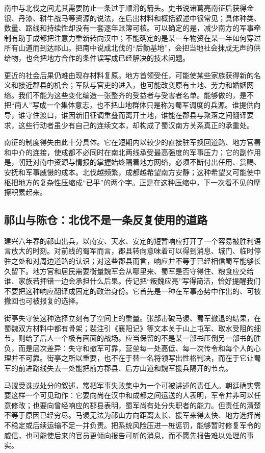 南中与北伐之间尤其需要防止一条过于顺滑的箭头。史书说诸葛亮南征后获得金银、丹漆、耕牛战马等资源的说法，在后出材料和概括叙述中很常见；具体种类、数量、路线和持续性却没有一套逐年账簿可核。可以确定的是，减少南方的军事牵制有助于成都把注意力重新转向汉中；不能确定的是某一车物资在某一年如何穿过所有山道而到达祁山。把南中说成北伐的“后勤基地”，会把当地社会抹成无声的供给物，也会把地方合作的条件误写成已经解决的技术问题。

更近的社会后果仍难由现存材料复原。地方首领受任，可能使某些家族获得新的名义和接近郡县的机会；军队与官吏的进入，也可能改变原有土地、劳力和婚姻网络。我们不能为这些变化编造一张整齐的受益者与受害者名单。能够做的，是不把“南人”写成一个集体意志，也不把山地群体只是称为蜀军调度的兵源。谁提供向导，谁守住渡口，谁因新旧征调重叠而离开土地，谁能在郡县与聚落之间翻译要求，这些行动者虽少有自己的连续文本，却构成了蜀汉南方关系真正的承重处。

南征的制度得失由此十分具体。它在短期内以较少的直接驻军换回道路、地方官署和中介的连接，使成都不必同时在南北两线承受最高强度的军事压力；它的副作用是，朝廷对南中资源与情报的掌握始终隔着地方网络，必须不断付出任用、赏赐、安抚和军事威慑的成本。北伐越频繁，成都越希望南方安静；这种希望又可能使中枢把地方的复杂性压缩成“已平”的两个字。正是在这种压缩中，下一次看不见的摩擦积累起来。

\subsection{祁山与陈仓：北伐不是一条反复使用的道路}

建兴六年春的祁山出兵，以南安、天水、安定的短暂响应打开了一个容易被胜利语言放大的时刻。对前线的蜀军而言，郡县转向意味着可以得到消息、城门、临时停驻之处和对周边道路的认识；对这些郡县而言，响应并不等于已经相信蜀军能够长久留下。地方官和居民需要衡量魏军会从哪里来、蜀军是否守得住、粮食应交给谁、家族若押错一边会承担什么后果。传记把“叛魏应亮”写得简洁，恰好提醒我们不要把这种响应翻译成固定的政治身份。它首先是一种在军事态势中作出的、可被撤回也可被报复的选择。

街亭失守使这种选择立刻有了空间上的重量。张郃击破马谡、蜀军撤退的结果，在蜀魏双方材料中都有骨架；裴注引《襄阳记》等文本关于山上屯军、取水受阻的细节，则给了后人一个极有画面的战场。应当保留的不是某一部书压倒另一部书的胜负，而是层次差异：失守和撤军可靠，营垒每一处高低、每一次传令和每个人的心理并不可靠。街亭之所以重要，也不在于替一名将领写出性格判决，而在于它让蜀军的前进路线失去一处能把前方郡县、后方山道和魏军援兵隔开的节点。

马谡受诛或处分的叙述，常把军事失败集中为一个可被讲述的责任人。朝廷确实需要这样一个可见动作：它要向尚在汉中和成都之间运送的人表明，军令并非可以任意修改；也要向曾经响应的郡县表明，蜀军尚有处分失职者的能力。但责任的清楚不等于原因已经穷尽。马谡无法为祁山方向距离太长、援军来得太快、地方选择尚不稳定或后续运输不足一并负责。把系统风险压进一桩惩罚，能够暂时修复军令的威信，也可能使后来的官员更倾向报告可听的消息，而不愿先报告难以处理的事实。

